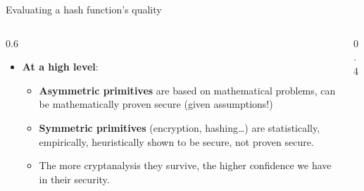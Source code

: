 \ifdefined\PRESENTATION\else\PassOptionsToClass{handout}{beamer}\fi\documentclass[aspectratio=169, lualatex]{beamer}
\begin{document}
\begin{frame}{Evaluating a hash function's quality}
	\begin{columns}[c]
		\begin{column}{0.6\textwidth}
			\begin{itemize}
				\item \textbf{At a high level}:
				      \begin{itemize}[<+->]
					      \item \textbf{Asymmetric primitives} are based on mathematical
					            problems, can be mathematically proven secure (given assumptions!)
					      \item \textbf{Symmetric primitives} (encryption, hashing\ldots)
					            are statistically, empirically, heuristically shown to be secure,
					            not proven secure.
					      \item The more cryptanalysis they survive, the higher confidence
					            we have in their security.
				      \end{itemize}
			\end{itemize}
		\end{column}

		\begin{column}{0.4\textwidth}
		\end{column}
	\end{columns}
\end{frame}
\end{document}
